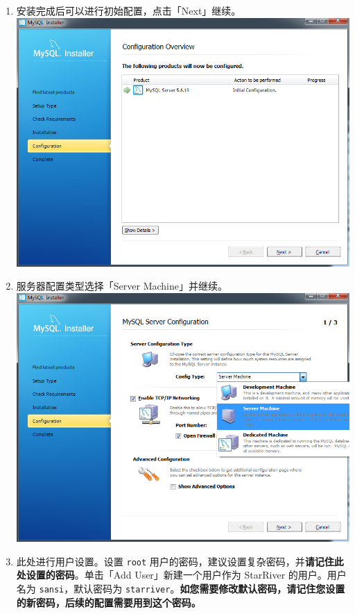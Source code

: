 \begin{enumerate}
\item
  安装完成后可以进行初始配置，点击「Next」继续。
  \includegraphics{../img/mysql_6.png}
\item
  服务器配置类型选择「Server Machine」并继续。
  \includegraphics{../img/mysql_7.png}
\item
  此处进行用户设置。设置 \texttt{root}
  用户的密码，建议设置复杂密码，并\textbf{请记住此处设置的密码}。单击「Add
  User」新建一个用户作为 StarRiver 的用户。用户名为
  \texttt{sansi}，默认密码为
  \texttt{starriver}。\textbf{如您需要修改默认密码，请记住您设置的新密码，后续的配置需要用到这个密码。}

\end{enumerate}
